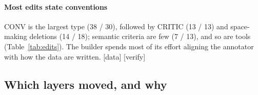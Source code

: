 \documentclass[11pt]{article}
\newcommand{\stag}[2]{\textcolor{#1}{\textsf{\scriptsize[#2]}}}
\newcommand{\HAVE}{\stag{green!50!black}{data}\xspace}
\newcommand{\CHK}{\stag{orange!80!black}{verify}\xspace}
\begin{document}
\begin{table}[t]
\centering\small
\setlength{\tabcolsep}{4pt}
\caption{Applied operations by type over ten rounds (coding manual and every coded operation in the appendix). \CHK{} (first-pass coding, to be checked by hand)}
\label{tab:edits}
\end{table}

\paragraph{Most edits state conventions}
CONV is the largest type (38 / 30), followed by CRITIC (13 / 13) and space-making deletions (14 / 18); semantic criteria are few (7 / 13), and so are tools (Table~\ref{tab:edits}). The builder spends most of its effort aligning the annotator with how the data are written. \HAVE{} \CHK

\subsection{Which layers moved, and why}
\label{sec:moved}
\end{document}
